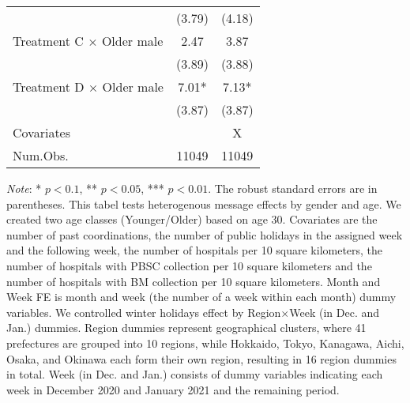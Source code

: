 \documentclass[12pt, a4paper]{article}
\begin{document}
\begin{table}[H]
\begin{threeparttable}
\begin{tabular}[t]{lcc}
 & (\num{3.79}) & (\num{4.18})\\
Treatment C $\times$ Older male & \num{2.47} & \num{3.87}\\
 & (\num{3.89}) & (\num{3.88})\\
Treatment D $\times$ Older male & \num{7.01}* & \num{7.13}*\\
 & (\num{3.87}) & (\num{3.87})\\
\midrule
Covariates &  & X\\
Num.Obs. & \num{11049} & \num{11049}\\
\bottomrule
\end{tabular}
\begin{tablenotes}
\item \emph{Note}: * $p < 0.1$, ** $p < 0.05$, *** $p < 0.01$. The robust standard errors are in parentheses. This tabel tests heterogenous message effects by gender and age. We created two age classes (Younger/Older) based on age 30. Covariates are the number of past coordinations, the number of public holidays in the assigned week and the following week, the number of hospitals per 10 square kilometers, the number of hospitals with PBSC collection per 10 square kilometers and the number of hospitals with BM collection per 10 square kilometers. Month and Week FE is month and week (the number of a week within each month) dummy variables. We controlled winter holidays effect by Region$\times$Week (in Dec. and Jan.) dummies. Region dummies represent geographical clusters, where 41 prefectures are grouped into 10 regions, while Hokkaido, Tokyo, Kanagawa, Aichi, Osaka, and Okinawa each form their own region, resulting in 16 region dummies in total. Week (in Dec. and Jan.) consists of dummy variables indicating each week in December 2020 and January 2021 and the remaining period.
\end{tablenotes}
\end{threeparttable}
\end{table}
\end{document}
